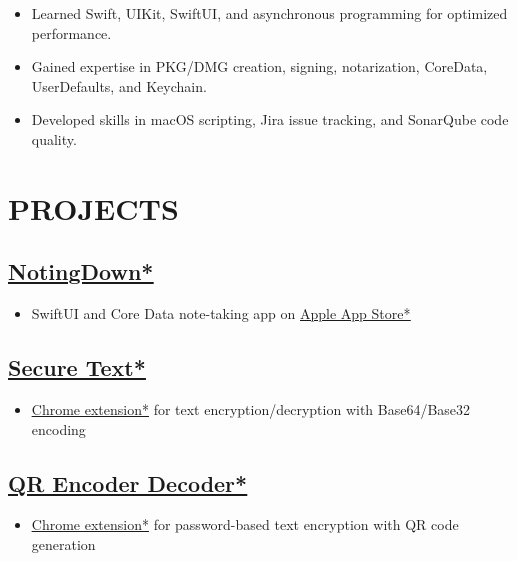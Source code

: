\documentclass[11pt,a4paper]{moderncv}
\let\oldhref\href
\renewcommand{\href}[2]{\oldhref{#1}{\underline{#2}}}
\begin{document}
\begin{minipage}[t]{0.62\textwidth}
\begin{itemize}
    \item Learned Swift, UIKit, SwiftUI, and asynchronous programming for optimized performance.
    \item Gained expertise in PKG/DMG creation, signing, notarization, CoreData, UserDefaults, and Keychain.
    \item Developed skills in macOS scripting, Jira issue tracking, and SonarQube code quality.
\end{itemize}

\section{PROJECTS}
\subsection{\href{https://github.com/sachin6174/NotingDown}{NotingDown*}}
\begin{itemize}
    \item SwiftUI and Core Data note-taking app on \href{https://apps.apple.com/us/app/notingdown/id123456789}{Apple App Store*}
\end{itemize}

\subsection{\href{https://github.com/sachin6174/SecureText}{Secure Text*}}
\begin{itemize}
    \item \href{https://chrome.google.com/webstore/detail/secure-text/id123456789}{Chrome extension*} for text encryption/decryption with Base64/Base32 encoding
\end{itemize}

\subsection{\href{https://github.com/sachin6174/QREncoderDecoder}{QR Encoder Decoder*}}
\begin{itemize}
    \item \href{https://chrome.google.com/webstore/detail/qr-encoder-decoder/id123456789}{Chrome extension*} for password-based text encryption with QR code generation
\end{itemize}

\end{minipage}
\hfill
\end{document}
